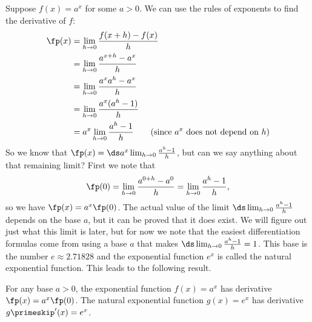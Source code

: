 Suppose $f(x)=a^x$ for some $a>0$. We can use the rules of exponents to find the derivative of $f$:
\begin{align*}
	\fp(x)
	&=\lim_{h\to 0}\frac{f(x+h)-f(x)}{h}\\
	&=\lim_{h\to 0}\frac{a^{x+h}-a^x}{h}\\
	&=\lim_{h\to 0}\frac{a^xa^h-a^x}{h}\\
	&=\lim_{h\to 0}\frac{a^x(a^h-1)}{h}\\
	&=a^x\lim_{h\to 0}\frac{a^h-1}{h} \qquad\text{(since $a^x$ does not depend on $h$)}\\
\end{align*}
So we know that $\fp(x)=\ds a^x \lim_{h\to 0}\frac{a^h-1}{h}$, but can we say anything about that remaining limit? First we note that
\[\fp(0)=\lim_{h\to 0}\frac  {a^{0+h}-a^0}{h}=\lim_{h\to 0}\frac{a^h-1}{h},\]
so we have $\fp(x)=a^x\fp(0)$. The actual value of the limit $\ds\lim_{h\to 0}\frac{a^h-1}{h}$ depends on the base $a$, but it can be proved that it does exist. We will figure out just what this limit is later, but for now we note that the easiest differentiation formulas come from using a base $a$ that makes $\ds\lim_{h\to 0}\frac{a^h-1}{h}=1$. This base is the
number $e\approx 2.71828$ and the exponential function $e^x$ is called the natural exponential function. This leads to the following result.

\begin{theorem}\label{thm_baby_exp_deriv}%
For any base $a>0$, the exponential function $f(x)=a^x$ has derivative $\fp(x)=a^x\fp(0)$. The natural exponential function $g(x)=e^x$ has derivative $g\primeskip'(x)=e^x$.
\end{theorem}



